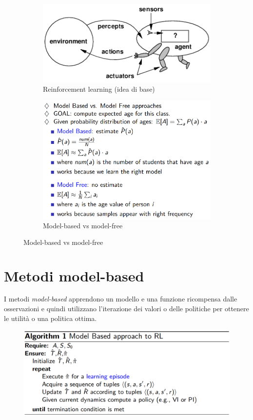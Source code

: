 \documentclass[11pt,oneside]{book}
\begin{document}
\begin{figure}[htp]
	\begin{subfigure}{0.49\textwidth}
	    \centering
		\includegraphics[width=\textwidth, height=\textheight, keepaspectratio]{rl1.png}
		\caption{Reinforcement learning (idea di base)}
	\end{subfigure}
	\hfill
	\begin{subfigure}{0.49\textwidth}
	    \centering
		\includegraphics[width=\textwidth, height=\textheight, keepaspectratio]{rl2.png}
		\caption{Model-based vs model-free}
	\end{subfigure}
\end{figure}

\section{Metodi model-based}
I metodi \textit{model-based} apprendono un modello e una funzione ricompensa dalle osservazioni e quindi utilizzano l'iterazione dei valori o delle politiche per ottenere le utilità o una politica ottima.
\begin{figure}[htp]
	\centering
	\includegraphics[width=\textwidth, height=\textheight, keepaspectratio]{rl3.png}
\end{figure}
\end{document}
